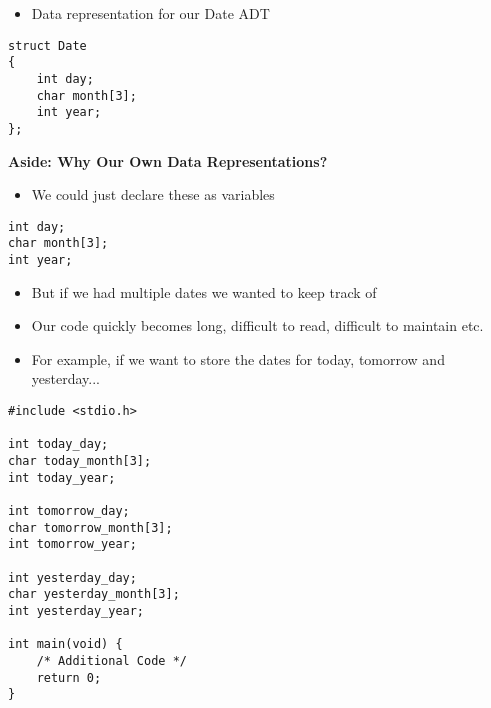 \documentclass{beamer}
\begin{document}
\begin{frame}[fragile]
\begin{itemize}
\item Data representation for our Date ADT 
\end{itemize}
\bigskip
\begin{block}{}
\begin{lstlisting}
struct Date
{
    int day;
    char month[3];
    int year;
};
\end{lstlisting}
\end{block}
\end{frame}

\begin{frame}[fragile]
\begin{center}
\textbf{Aside: Why Our Own Data Representations?}
\end{center}
\begin{itemize}
\item We could just declare these as variables
\end{itemize}

\begin{block}{}
\begin{lstlisting}
int day;
char month[3];
int year;
\end{lstlisting}
\end{block}
\end{frame}

\begin{frame}
\begin{itemize}
\item But if we had multiple dates we wanted to keep track of 
\item Our code quickly becomes long, difficult to read, difficult to maintain etc.
\bigskip
\item For example, if we want to store the dates for today, tomorrow and yesterday... 
\end{itemize}
\end{frame}

\begin{frame}[fragile]
\begin{block}{}
\begin{lstlisting}
#include <stdio.h>

int today_day;
char today_month[3];
int today_year;

int tomorrow_day;
char tomorrow_month[3];
int tomorrow_year;

int yesterday_day;
char yesterday_month[3];
int yesterday_year;

int main(void) {
	/* Additional Code */
	return 0;
}
\end{lstlisting}
\end{block}
\end{frame}
\end{document}
